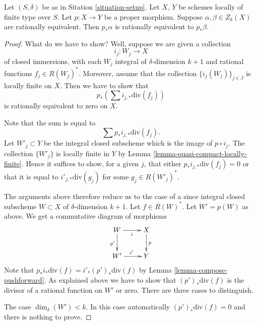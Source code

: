 \begin{lemma}
\label{lemma-proper-pushforward-rational-equivalence}
Let $(S, \delta)$ be as in Sitation \ref{situation-setup}.
Let $X$, $Y$ be schemes locally of finite type over $S$.
Let $p : X \to Y$ be a proper morphism.
Suppose $\alpha, \beta \in Z_k(X)$ are rationally equivalent.
Then $p_*\alpha$ is rationally equivalent to $p_*\beta$.
\end{lemma}

\begin{proof}
What do we have to show? Well, suppose we are given a collection
$$
i_j : W_j \longrightarrow X
$$
of closed immersions, with each $W_j$ integral of $\delta$-dimension $k + 1$
and rational functions $f_j \in R(W_j)^*$.
Moreover, assume that
the collection $\{i_j(W_j)\}_{j \in J}$ is locally finite on $X$.
Then we have to show that
$$
p_*\left(\sum i_{j, *}\text{div}(f_j)\right)
$$
is rationally equivalent to zero on $X$.

\medskip\noindent
Note that the sum is equal to
$$
\sum p_*i_{j, *}\text{div}(f_j).
$$
Let $W'_j \subset Y$ be the integral closed subscheme which is the
image of $p \circ i_j$. The collection $\{W'_j\}$ is locally finite
in $Y$ by Lemma \ref{lemma-quasi-compact-locally-finite}.
Hence it suffices to show, for a given $j$, that either
$p_*i_{j, *}\text{div}(f_j) = 0$ or that it
is equal to $i'_{j, *}\text{div}(g_j)$ for some $g_j \in R(W'_j)^*$.

\medskip\noindent
The arguments above therefore reduce us to the case of a since
integral closed subscheme $W \subset X$ of $\delta$-dimension $k + 1$.
Let $f \in R(W)^*$. Let $W' = p(W)$ as above.
We get a commutative diagram of morphisms
$$
\xymatrix{
W \ar[r]_i \ar[d]_{p'} & X \ar[d]^p \\
W' \ar[r]^{i'} & Y
}
$$
Note that $p_*i_*\text{div}(f) = i'_*(p')_*\text{div}(f)$ by
Lemma \ref{lemma-compose-pushforward}. As explained above
we have to show that $(p')_*\text{div}(f)$
is the divisor of a rational function on $W'$ or zero.
There are three cases to distinguish.

\medskip\noindent
The case $\dim_\delta(W') < k$. In this case automatically
$(p')_*\text{div}(f) = 0$ and there is nothing to prove.


\end{proof}

